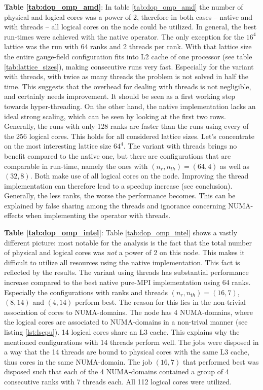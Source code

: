 \documentclass{article}
\theoremstyle{plain} %
\theoremstyle{convention} %
\theoremstyle{remark} %
\numberwithin{equation}{section}
\begin{document}
\textbf{Table \ref{tab:dop_omp_amd}}: In table \ref{tab:dop_omp_amd} the number of physical and logical cores was a power of \num{2}, therefore in both cases -- native and with threads -- all logical cores on the node could be utilized. In general, the best run-times were achieved with the native operator. The only exception for the $16^4$ lattice was the run with \num{64} ranks and \num{2} threads per rank. With that lattice size the entire gauge-field configuration fits into L2 cache of one processor (see table \ref{tab:lattice_sizes}), making consecutive runs very fast. Especially for the variant with threads, with twice as many threads the problem is not solved in half the time. This suggests that the overhead for dealing with threads is not negligible, and certainly needs improvement. It should be seen as a first working step towards hyper-threading. On the other hand, the native implementation lacks an ideal strong scaling, which can be seen by looking at the first two rows. Generally, the runs with only \num{128} ranks are faster than the runs using every of the \num{256} logical cores. This holds for all considered lattice sizes. Let's concentrate on the most interesting lattice size $64^4$. The variant with threads brings no benefit compared to the native one, but there are configurations that are comparable in run-time, namely the ones with $(n_r, n_{th})=(64,4)$ as well as $(32,8)$. Both make use of all logical cores on the node. Improving the thread implementation can therefore lead to a speedup increase (see conclusion). Generally, the less ranks, the worse the performance becomes. This can be explained by false sharing among the threads and ignorance concerning NUMA-effects when implementing the operator with threads.

\textbf{Table \ref{tab:dop_omp_intel}}: Table \ref{tab:dop_omp_intel} shows a vastly different picture: most notable for the analysis is the fact that the total number of physical and logical cores was \textit{not} a power of \num{2} on this node. This makes it difficult to utilize all resources using the native implementation. This fact is reflected by the results. The variant using threads has substantial performance increase compared to the best native pure-MPI implementation using \num{64} ranks. Especially the configurations with ranks and threads $(n_r, n_{th})=(16,7)$, $(8,14)$ and $(4,14)$ perform best. The reason for this lies in the non-trivial association of cores to NUMA-domains. The node has \num{4} NUMA-domains, where the logical cores are associated to NUMA-domains in a non-trival manner (see listing \ref{lst:lscpu}). \num{14} logical cores share an L3 cache. This explains why the mentioned configurations with \num{14} threads perform well. The jobs were disposed in a way that the \num{14} threads are bound to physical cores with the same L3 cache, thus cores in the same NUMA-domain. The job $(16,7)$ that performed best was disposed such that each of the \num{4} NUMA-domains contained a group of \num{4} consecutive ranks with \num{7} threads each. All \num{112} logical cores were utilized.
\end{document}

